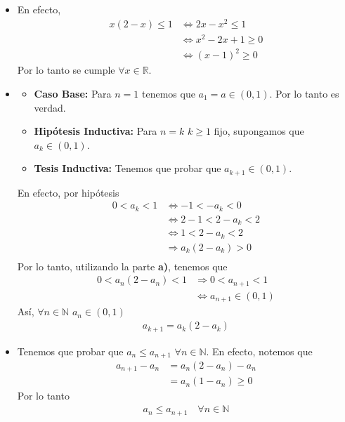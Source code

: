 \documentclass[12pt]{book}
\begin{document}
\begin{itemize}
    \item[\textbf{a)}] En efecto,
    \begin{align*}
        x(2-x) \leq 1 &\Longleftrightarrow 2x-x^2\leq 1  \\
        &\Longleftrightarrow x^2 -2x +1 \geq 0  \\
         &\Longleftrightarrow (x-1)^2 \geq 0 
    \end{align*}
    Por lo tanto se cumple $\forall x \in \mathbb{R}$.
    \item[\textbf{b)}] 

    \begin{itemize}
        \item \textbf{Caso Base:} Para $n=1$ tenemos que $a_1=a \in (0,1)$. Por lo tanto es verdad.

        \item \textbf{Hipótesis Inductiva:} Para $n=k$ $k\geq 1$ fijo, supongamos que $a_k \in (0,1)$.
        \item \textbf{Tesis Inductiva:} Tenemos que probar que $a_{k+1} \in (0,1)$.
    \end{itemize}
    En efecto, por hipótesis 
    \begin{align*}
        0<a_k < 1 &\Longleftrightarrow -1 < -a_k < 0 \\
         &\Longleftrightarrow 2-1 < 2-a_k < 2 \\
          &\Longleftrightarrow 1 < 2-a_k < 2 \\
           &\Longrightarrow a_k(2-a_k)>0 \\
    \end{align*}
    Por lo tanto, utilizando la parte \textbf{a)}, tenemos que 
    \begin{align*}
        0<a_n(2-a_n) <1 &\Longrightarrow 0 < a_{n+1} <1 \\
        &\Longleftrightarrow a_{n+1} \in (0,1)
    \end{align*}
    Así, $\forall n \in \mathbb{N}$ $a_n \in (0,1)$
    \begin{align*}
        a_{k+1}=a_k(2-a_k) 
    \end{align*}
    \item[\textbf{c)}] Tenemos que probar que $a_n \leq a_{n+1}$ $\forall n \in \mathbb{N}$.
    En efecto, notemos que 
    \begin{align*}
        a_{n+1}-a_n&=a_n(2-a_n) -a _n \\
        &=a_n(1-a_n) \geq 0
    \end{align*}
    Por lo tanto
    \begin{align*}
        a_n \leq a_{n+1} 
 \quad \forall n \in \mathbb{N}
    \end{align*}
    

\end{itemize}
\end{document}
